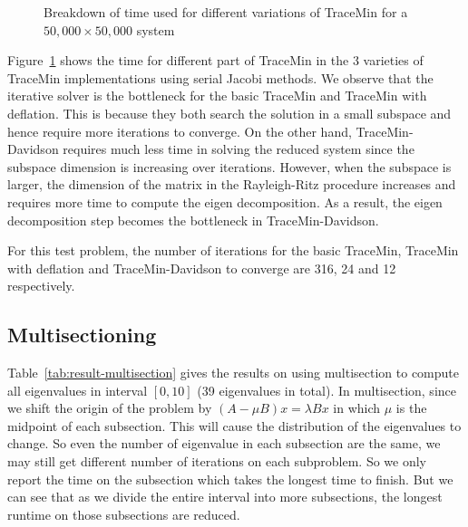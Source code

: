 \begin{figure}[htbp]
	\centering
	\caption{Breakdown of time used for different variations of TraceMin for a $50,000 \times 50,000$ system}
  \label{fig:comp}
\end{figure}

Figure~\ref{fig:comp} shows the time for different part of TraceMin in the 3 varieties of TraceMin implementations
using serial Jacobi methods. We observe that the iterative solver is the bottleneck for the basic TraceMin and
TraceMin with deflation. This is because they both search the solution in a small subspace and hence require more
iterations to converge. On the other hand, TraceMin-Davidson requires much less time in solving the reduced system
since the subspace dimension is increasing over iterations. However, when the subspace is larger, the dimension of
the matrix in the Rayleigh-Ritz procedure increases and requires more time to compute the eigen decomposition. As a
result, the eigen decomposition step becomes the bottleneck in TraceMin-Davidson.

For this test problem, the number of iterations for the basic TraceMin, TraceMin with deflation and TraceMin-Davidson
to converge are 316, 24 and 12 respectively.

\subsection{Multisectioning}
Table~\ref{tab:result-multisection} gives the results on using multisection to compute all eigenvalues in interval
$[0, 10]$ (39 eigenvalues in total). In multisection, since we shift the origin of the problem by
$\left(A - \mu B\right) x = \lambda B x$ in which $\mu$ is the midpoint of each subsection. This will cause the
distribution of the eigenvalues to change. So even the number of eigenvalue in each subsection are the same, we may
still get different number of iterations on each subproblem. So we only report the time on the subsection which takes
the longest time to finish. But we can see that as we divide the entire interval into more subsections, the longest
runtime on those subsections are reduced. 

